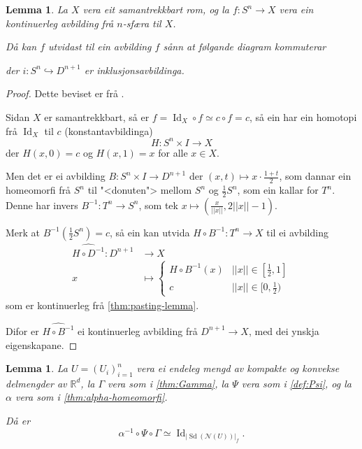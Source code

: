 \documentclass[a4paper, 12pt, norsk]{article}
\theoremstyle{plain}
\newtheorem{lemma}[theorem]{Lemma}
\theoremstyle{definition}
\newcommand{\Rb}{\mathbb{R}}
\newcommand{\Nc}{\mathcal{N}}
\newcommand{\gr}[1]{ \lvert #1 \rvert } %
\newcommand{\tuple}[1]{ \left( #1 \right) } %
\DeclareMathOperator{\Sd}{Sd} %
\DeclareMathOperator{\Id}{Id} %
\begin{document}
\begin{lemma} \label{thm:utvida-avb}
	La \( X \) vera eit samantrekkbart rom, og la \( f: S^n \to X \) vera ein kontinuerleg avbilding frå \( n \)-sfæra til \( X \). 
	
	Då kan \( f \) utvidast til ein avbilding \( \hat{f} \) sånn at følgande diagram kommuterar

	\begin{center}
	\end{center}
	der \( i: S^n \hookrightarrow D^{n+1} \) er inklusjonsavbildinga.
\end{lemma}

\begin{proof}
	Dette beviset er frå \cite[s. 319--320]{MR3932132}.

	Sidan \( X \) er samantrekkbart, så er \( f = \Id_X \circ f \simeq c \circ f = c \), så ein har ein homotopi frå \( \Id_X \) til \( c \) (konstantavbildinga)
	\[
		H: S^n \times I \to X
	\]
	der \( H(x, 0) = c \) og \( H(x, 1) = x \) for alle \( x \in X \).

	Men det er ei avbilding \( B: S^n \times I \to D^{n+1} \) der \( (x,t) \mapsto x\cdot\frac{1+t}{2} \), som dannar ein homeomorfi frå \( S^n \) til "<donuten"> mellom \( S^n \) og \( \frac{1}{2}S^n \), som ein kallar for \( T^n \). Denne har invers \( B^{-1}: T^n \to S^n \), som tek \( x \mapsto \tuple{\frac{x}{||x||}, 2||x||-1} \).
	
	Merk at \( B^{-1}\tuple{\frac{1}{2}S^n}= c \), så ein kan utvida \( H \circ B^{-1}: T^n \to X \) til ei avbilding
	\begin{align*}
		\widehat{H \circ D^{-1}} : D^{n+1} &\to X \\
		x &\mapsto
		\begin{cases}
			H \circ B^{-1}(x) & ||x|| \in [\frac{1}{2}, 1] \\
			c & ||x|| \in [0, \frac{1}{2})
		\end{cases}
	\end{align*}
	som er kontinuerleg frå \autoref{thm:pasting-lemma}.

	Difor er \( \widehat{H \circ B^{-1}} \) ei kontinuerleg avbilding frå \( D^{n+1} \to X \), med dei ynskja eigenskapane.
\end{proof}

\begin{lemma} \label{thm:homeq-sd}
	La \( U = \tuple{U_i}_{i=1}^n \) vera ei endeleg mengd av kompakte og konvekse delmengder av \( \Rb^d \), la \( \Gamma \) vera som i \autoref{thm:Gamma}, la \( \Psi \) vera som i \autoref{def:Psi}, og la \( \alpha \) vera som i \autoref{thm:alpha-homeomorfi}. 
	
	Då er
	\[
		\alpha^{-1} \circ \Psi \circ \Gamma \simeq \Id_{\gr{\Sd(\Nc(U))}_f}.
	\]
\end{lemma}
\end{document}
